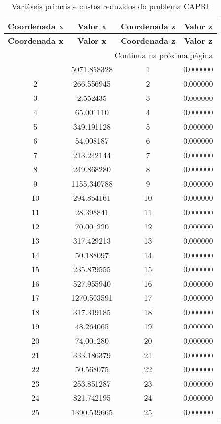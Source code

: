 \documentclass[12pt]{article}
\begin{document}
\begin{longtable}{@{}cccc@{}}
\caption{Variáveis primais e custos reduzidos do problema CAPRI} \\
\toprule
\textbf{Coordenada x} & \textbf{Valor x} & \textbf{Coordenada z} & \textbf{Valor z} \\
\midrule
\endfirsthead

\toprule
\textbf{Coordenada x} & \textbf{Valor x} & \textbf{Coordenada z} & \textbf{Valor z} \\
\midrule
\endhead

\midrule \multicolumn{4}{r}{{Continua na próxima página}} \\ \midrule
\endfoot

\bottomrule
\endlastfoot
1 & 5071.858328 & 1 & 0.000000 \\
2 & 266.556945 & 2 & 0.000000 \\
3 & 2.552435 & 3 & 0.000000 \\
4 & 65.001110 & 4 & 0.000000 \\
5 & 349.191128 & 5 & 0.000000 \\
6 & 54.008187 & 6 & 0.000000 \\
7 & 213.242144 & 7 & 0.000000 \\
8 & 249.868280 & 8 & 0.000000 \\
9 & 1155.340788 & 9 & 0.000000 \\
10 & 294.854161 & 10 & 0.000000 \\
11 & 28.398841 & 11 & 0.000000 \\
12 & 70.001220 & 12 & 0.000000 \\
13 & 317.429213 & 13 & 0.000000 \\
14 & 50.188097 & 14 & 0.000000 \\
15 & 235.879555 & 15 & 0.000000 \\
16 & 527.955940 & 16 & 0.000000 \\
17 & 1270.503591 & 17 & 0.000000 \\
18 & 317.319185 & 18 & 0.000000 \\
19 & 48.264065 & 19 & 0.000000 \\
20 & 74.001280 & 20 & 0.000000 \\
21 & 333.186379 & 21 & 0.000000 \\
22 & 50.568075 & 22 & 0.000000 \\
23 & 253.851287 & 23 & 0.000000 \\
24 & 821.742195 & 24 & 0.000000 \\
25 & 1390.539665 & 25 & 0.000000 \\

\end{longtable}
\end{document}
